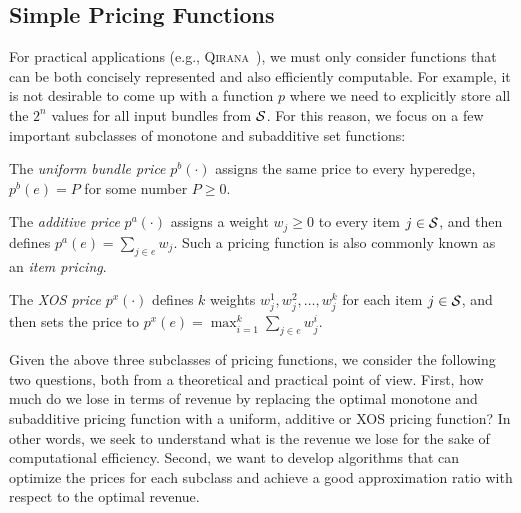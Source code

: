 \subsection{Simple Pricing Functions}

For practical applications (e.g., \textsc{Qirana}~\cite{deep2017qirana}), we must only consider functions that can be both concisely represented and also efficiently computable. For example, it is not desirable to come up with a function $p$ where we need to explicitly store all the $2^n$ values for all input bundles from $\mathcal{S}$.
For this reason, we focus on a few important subclasses of monotone and subadditive set functions:
%
\begin{packed_item}
\item The {\em uniform bundle price}  $p^b(\cdot)$ assigns the same price to every hyperedge, \ie $p^b(e) = P$ for some number $P \geq 0$.
%
\item The {\em additive price} $p^a(\cdot)$ assigns a weight $w_j \geq 0$ to every item $j \in \mathcal{S}$, and then defines
$p^a(e) = \sum_{j \in e} w_j$. Such a pricing function is also commonly known as an {\em item pricing}.
%
\item The {\em XOS price} $p^x(\cdot)$ defines $k$ weights $w_j^1, w_j^2, \dots, w_j^k$ for each item $j \in \mathcal{S}$, and then sets the price to $p^x(e) = \max_{i=1}^k \sum_{j \in e} w_j^i$.
\end{packed_item}

Given the above three subclasses of pricing functions, we consider the following two questions, both from a theoretical and practical point of view.
First, how much do we lose in terms of revenue by replacing the optimal monotone and subadditive pricing function with a uniform, additive or XOS pricing function? In other words, we seek to understand what is the revenue we lose for the sake of computational efficiency.
Second, we want to develop algorithms that can optimize the prices for each subclass and achieve a good approximation ratio with respect to the optimal revenue.


